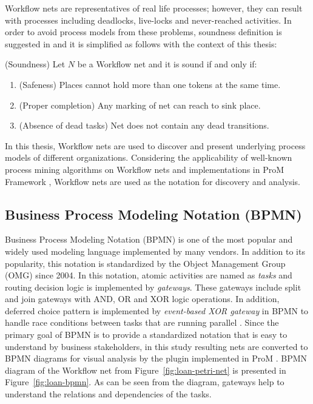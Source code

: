 Workflow nets are representatives of real life processes; however, they can result with processes including deadlocks, live-locks and never-reached activities. In order to avoid process models from these problems, soundness definition is suggested in \cite{van1998application} and it is simplified as follows with the context of this thesis:
\theoremstyle{definition}
\begin{definition}{}
(Soundness) Let $N$ be a Workflow net and it is sound if and only if:
\begin{enumerate}
  \item  (Safeness) Places cannot hold more than one tokens at the same time.
  \item  (Proper completion) Any marking of net can reach to sink place.
  \item  (Absence of dead tasks) Net does not contain any dead transitions.  
\end{enumerate}
\end{definition}

In this thesis, Workflow nets are used to discover and present underlying process models of different organizations. Considering the applicability of well-known process mining algorithms on Workflow nets and implementations in ProM Framework \cite{verbeek2010prom}, Workflow nets are used as the notation for discovery and analysis.

\subsection{Business Process Modeling Notation (BPMN)}
\label{sec:bpmn} 
Business Process Modeling Notation (BPMN) is one of the most popular and widely used modeling language implemented by many vendors. In addition to its popularity, this notation is standardized by the Object Management Group (OMG) since 2004. In this notation, atomic activities are named as \textit{tasks} and routing decision logic is implemented by \textit{gateways}. These gateways include split and join gateways with AND, OR and XOR logic operations. In addition, deferred choice pattern is implemented by \textit{event-based XOR gateway} in BPMN to handle race conditions between tasks that are running parallel \cite{van2003workflow}. Since the primary goal of BPMN is to provide a standardized notation that is easy to understand by business stakeholders, in this study resulting nets are converted to BPMN diagrams for visual analysis by the plugin implemented in ProM \cite{kalenkovaprocess}. BPMN diagram of the Workflow net from Figure~\ref{fig:loan-petri-net} is presented in Figure~\ref{fig:loan-bpmn}. As can be seen from the diagram, gateways help to understand the relations and dependencies of the tasks.

